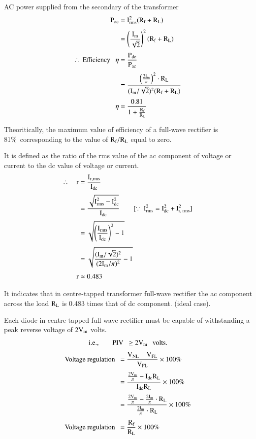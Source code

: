 AC power supplied from the secondary of the transformer
\begin{align}
\textrm{P}_{\text{ac}} &= \textrm{I}^{2}_{\text{rms}}(\textrm{R}_{\textrm{f}}+\textrm{R}_{\textrm{L}})\notag\\[3pt]
              &= \left(\dfrac{\textrm{I}_{\textrm{m}}}{\sqrt{2}}\right)^{2}(\textrm{R}_{\textrm{f}}+\textrm{R}_{\textrm{L}})\notag\\[3pt]
\therefore~ \text{Efficiency ~ }\eta &= \frac{\textrm{P}_{\text{dc}}}{\textrm{P}_{\text{ac}}}\notag\\[3pt]
&= \frac{\left(\frac{2\textrm{I}_{\textrm{m}}}{\pi}\right)^{2}\cdot \textrm{R}_{\textrm{L}}}{(\textrm{I}_{\textrm{m}}/\sqrt{2})^{2}(\textrm{R}_{\textrm{f}}+\textrm{R}_{\textrm{L}})}\notag\\[3pt]
\eta &= \frac{0.81}{1+\frac{\textrm{R}_{\textrm{f}}}{\textrm{R}_{\textrm{L}}}}\label{eq1.20}
\end{align}

Theoritically, the maximum value of efficiency of a full-wave rectifier is 81\%\ corresponding to the value of $\textrm{R}_{\textrm{f}}/\textrm{R}_{\textrm{L}}$ equal to zero.

\smallskip
{} It is defined as the ratio of the rms value of the ac component of voltage or current to the dc value of voltage or current.
\begin{align}
\therefore\quad \textrm{r} &= \frac{\textrm{I}_{\textrm{r}, \text{rms}}}{\textrm{I}_{\text{dc}}}\notag\\[3pt]
&= \frac{\sqrt{\textrm{I}_{\text{rms}}^{2}-\textrm{I}^{2}_{\text{dc}}}}{\textrm{I}_{\text{dc}}}\qquad [\because \ \textrm{I}^{2}_{\text{rms}}=\textrm{I}^{2}_{\text{dc}}+\textrm{I}^{2}_{\text{r, rms}}]\notag\\[3pt]
&= \sqrt{\left(\frac{\textrm{I}_{\text{rms}}}{\textrm{I}_{\text{dc}}}\right)^{2}-1}\notag\\[3pt]
&= \sqrt{\frac{(\textrm{I}_{\textrm{m}}/\sqrt{2})^{2}}{(2\textrm{I}_{\textrm{m}}/\pi)^{2}}-1}\notag\\[3pt]
\textrm{r} &\simeq 0.483\label{eq1.21}
\end{align}

It indicates that in centre-tapped transformer full-wave rectifier the ac component across the load $\textrm{R}_{\textrm{L}}$ is 0.483 times that of dc component. (ideal case).

\smallskip
{} Each diode in centre-tapped full-wave rectifier must be capable of withstanding a peak reverse voltage of $2\textrm{V}_{\textrm{m}}$ volts.
$$
\text{i.e.,}\qquad \text{PIV~ }\geq 2\textrm{V}_{\textrm{m}}\text{~~ volts.}
$$
\begin{align}
\text{Voltage regulation~ } &= \frac{\textrm{V}_{\text{NL}}-\textrm{V}_{\text{FL}}}{\textrm{V}_{\text{FL}}}\times 100\%\notag\\[3pt]
&= \frac{\frac{2\textrm{V}_{\textrm{m}}}{\pi}-\textrm{I}_{\text{dc}}\textrm{R}_{\textrm{L}}}{\textrm{I}_{\text{dc}}\textrm{R}_{\textrm{L}}}\times 100\%\notag\\[3pt]
&= \frac{\frac{2\textrm{V}_{\textrm{m}}}{\pi}-\frac{2\textrm{I}_{\textrm{m}}}{\pi}\cdot \textrm{R}_{\textrm{L}}}{\frac{2\textrm{I}_{\textrm{m}}}{\pi}\cdot \textrm{R}_{\textrm{L}}}\times 100\%\notag\\[3pt]
\text{Voltage regulation~ } &= \frac{\textrm{R}_{\textrm{f}}}{\textrm{R}_{\textrm{L}}}\times 100\%\label{eq2.22}
\end{align}

